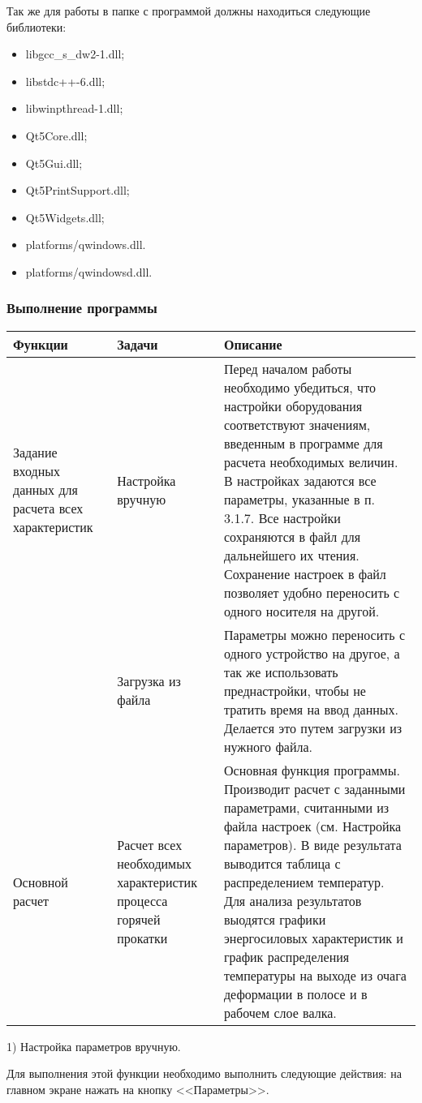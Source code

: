 Так же для работы в папке с программой должны находиться следующие библиотеки:
\begin{itemize}
\item libgcc\_s\_dw2-1.dll;
\item libstdc++-6.dll;
\item libwinpthread-1.dll;
\item Qt5Core.dll;
\item Qt5Gui.dll;
\item Qt5PrintSupport.dll;
\item Qt5Widgets.dll;
\item platforms/qwindows.dll.
\item platforms/qwindowsd.dll.
\end{itemize}
\subsubsection{Выполнение программы}
\begin{longtable}{|p{3cm}|p{4cm}|p{8cm}|}
\hline
Функции & Задачи & Описание\\
\hline
Задание входных данных для расчета всех характеристик & Настройка вручную & Перед началом работы необходимо убедиться, что настройки оборудования соответствуют значениям, введенным в программе для расчета необходимых величин. В настройках задаются все параметры, указанные в п. 3.1.7. Все настройки сохраняются в файл для дальнейшего их чтения. Сохранение настроек в файл позволяет удобно переносить с одного носителя на другой.\\ \cline{2-3}
 & Загрузка из файла & Параметры можно переносить с одного устройство на другое, а так же использовать преднастройки, чтобы не тратить время на ввод данных. Делается это путем загрузки из нужного файла.\\
\hline
Основной расчет & Расчет всех необходимых характеристик процесса горячей прокатки & Основная функция программы. Производит расчет с заданными параметрами, считанными из файла настроек (см. Настройка параметров). В виде результата выводится таблица с распределением температур. Для анализа результатов выодятся графики энергосиловых характеристик и график распределения температуры на выходе из очага деформации в полосе и в рабочем слое валка.\\
\hline
\end{longtable}

1) Настройка параметров вручную.

Для выполнения этой функции необходимо выполнить следующие действия: на главном экране нажать на кнопку <<Параметры>>.

